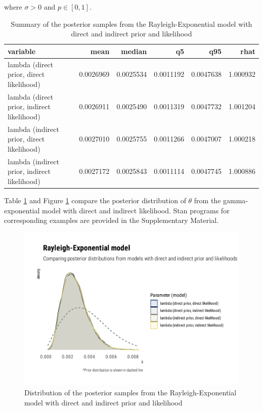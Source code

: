 \documentclass[
  12pt,
]{article}
\begin{document}
where \(\sigma>0\) and \(p \in [0,1]\).

\begin{table}[!h]

\caption{\label{tab:rexp-prior-lik-tab}Summary of the posterior samples from the Rayleigh-Exponential model with direct and indirect prior and likelihood}
\centering
\begin{tabular}[t]{lrrrrr}
\toprule
variable & mean & median & q5 & q95 & rhat\\
\midrule
lambda (direct prior, direct likelihood) & 0.0026969 & 0.0025534 & 0.0011192 & 0.0047638 & 1.000932\\
lambda (direct prior, indirect likelihood) & 0.0026911 & 0.0025490 & 0.0011319 & 0.0047732 & 1.001204\\
lambda (indirect prior, direct likelihood) & 0.0027010 & 0.0025755 & 0.0011266 & 0.0047007 & 1.000218\\
lambda (indirect prior, indirect likelihood) & 0.0027172 & 0.0025843 & 0.0011114 & 0.0047745 & 1.000886\\
\bottomrule
\end{tabular}
\end{table}

Table \ref{tab:rexp-prior-lik-tab} and Figure \ref{fig:rexp-prior-lik-graphs} compare the posterior distribution of \(\theta\) from the gamma-exponential model with direct and indirect likelihood. Stan programs for corresponding examples are provided in the Supplementary Material.

\begin{figure}

{\centering \includegraphics[width=0.5\linewidth]{ilbm_article_files/figure-latex/rexp-prior-lik-graphs-1} 

}

\caption{Distribution of the posterior samples from the Rayleigh-Exponential model with direct and indirect prior and likelihood}\label{fig:rexp-prior-lik-graphs}
\end{figure}
\end{document}

